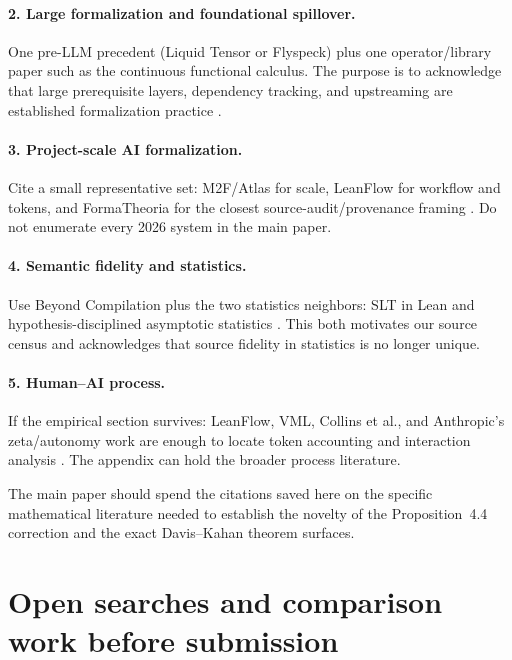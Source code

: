 \documentclass[11pt]{article}
\begin{document}
\paragraph{2. Large formalization and foundational spillover.}
One pre-LLM precedent (Liquid Tensor or Flyspeck) plus one operator/library paper
such as the continuous functional calculus.  The purpose is to acknowledge that
large prerequisite layers, dependency tracking, and upstreaming are established
formalization practice \citep{hales2017kepler,liquidblueprint2023,dedecker2025cfc}.

\paragraph{3. Project-scale AI formalization.}
Cite a small representative set: M2F/Atlas for scale, LeanFlow for workflow and
tokens, and FormaTheoria for the closest source-audit/provenance framing
\citep{wang2026m2f,rammal2026scale,milikic2026leanflow,nie2026formatheoria}.
Do not enumerate every 2026 system in the main paper.

\paragraph{4. Semantic fidelity and statistics.}
Use Beyond Compilation plus the two statistics neighbors: SLT in Lean and
hypothesis-disciplined asymptotic statistics
\citep{zhang2026beyondcompilation,zhang2026slt,wei2026asymptotic}.  This both
motivates our source census and acknowledges that source fidelity in statistics
is no longer unique.

\paragraph{5. Human--AI process.}
If the empirical section survives: LeanFlow, VML, Collins et al., and Anthropic's
zeta/autonomy work are enough to locate token accounting and interaction analysis
\citep{milikic2026leanflow,ilin2026vml,collins2026humanai,anthropic2026zeta,mccain2026autonomy}.
The appendix can hold the broader process literature.

The main paper should spend the citations saved here on the specific mathematical
literature needed to establish the novelty of the Proposition~4.4 correction and
the exact Davis--Kahan theorem surfaces.

\section{Open searches and comparison work before submission}
\label{sec:open-search}
\end{document}
